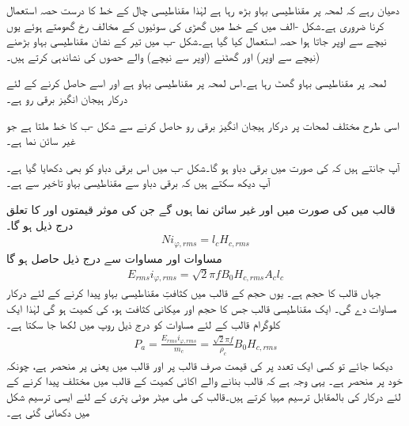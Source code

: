 دھیان رہے کہ لمحہ  پر مقناطیسی بہاو بڑھ رہا ہے لہٰذا مقناطیسی چال کے خط کا درست حصہ استعمال کرنا ضروری ہے۔شکل -الف میں    کے خط میں گھڑی کی سوئیوں کے مخالف رخ گھومتے ہوئے یوں نیچے سے اوپر جاتا ہوا حصہ استعمال کیا گیا ہے۔شکل -ب میں  تیر کے نشان  مقناطیسی بہاو بڑھنے (نیچے سے اوپر) اور گھٹنے (اوپر سے نیچے) والے حصوں کی نشاندہی کرتے ہیں۔


 لمحہ  پر مقناطیسی بہاو گھٹ رہا ہے۔اس لمحہ پر مقناطیسی بہاو  ہے اور اسے حاصل کرنے کے لئے درکار ہیجان انگیز برقی رو  ہے۔

اسی طرح مختلف لمحات پر درکار ہیجان انگیز برقی رو حاصل کرنے سے شکل -ب کا      خط ملتا ہے جو  غیر سائن نما ہے۔

آپ جانتے ہیں کہ   کی صورت میں برقی دباو  ہو گا۔شکل -ب میں اس برقی دباو کو بھی دکھایا گیا ہے۔آپ دیکھ سکتے ہیں کہ برقی دباو سے  مقناطیسی بہاو  تاخیر سے ہے۔

قالب میں   کی صورت میں   اور   غیر سائن نما ہوں گے جن  کی موثر قیمتوں  اور   کا تعلق درج ذیل ہو گا۔
\begin{align}\label{مساوات_مقناطیسی_دور_دباو_برابر_شدت_ضرب_لمبائی}
N i_{\varphi,rms}=l_c H_{c,rms}
\end{align}
مساوات    اور مساوات   سے درج ذیل حاصل ہو گا
\begin{align}\label{مساوات_مقناطیسی_دور_درکار_دباو_ضرب_رو}
E_{rms} i_{\varphi,rms}=\sqrt{2} \pi f B_0 H_{c,rms} A_c l_c
\end{align}
جہاں   قالب کا حجم ہے۔ یوں    حجم کے قالب  میں   کثافتِ مقناطیسی بہاو پیدا کرنے کے لئے درکار  مساوات   دے گی۔ ایک مقناطیسی قالب جس کا حجم   اور  میکانی کثافت   ہو، کی کمیت  ہو گی لہٰذا  ایک کلوگرام  قالب کے لئے مساوات  کو  درج ذیل روپ میں لکھا جا سکتا ہے۔
\begin{align}
P_a=\frac{E_{rms} i_{\varphi,rms}}{m_c}=\frac{\sqrt{2} \pi f}{\rho_c} B_0 H_{c,rms}
\end{align}
دیکھا جائے تو کسی ایک تعدد   پر  کی قیمت صرف قالب پر اور قالب میں  یعنی  پر منحصر ہے، چونکہ  خود  پر منحصر ہے۔ یہی وجہ ہے کہ  قالب بنانے والے اکائی کمیت کے قالب میں مختلف  پیدا کرنے کے لئے درکار  کی  بالمقابل  ترسیم مہیا کرتے ہیں۔قالب کی  ملی میٹر موٹی پتری کے لئے ایسی ترسیم  شکل  میں دکھائی گئی ہے۔
